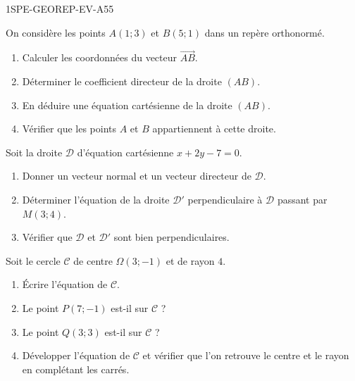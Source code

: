 \begin{evaluation}{1SPE-GEOREP-EV-A}{55}



On considère les points $A(1 ; 3)$ et $B(5 ; 1)$ dans un repère orthonormé.

\begin{enumerate}
  \item Calculer les coordonnées du vecteur $\vec{AB}$.
  \item Déterminer le coefficient directeur de la droite $(AB)$.
  \item En déduire une équation cartésienne de la droite $(AB)$.
  \item Vérifier que les points $A$ et $B$ appartiennent à cette droite.
\end{enumerate}



Soit la droite $\mathcal{D}$ d'équation cartésienne $x + 2y - 7 = 0$.

\begin{enumerate}
  \item Donner un vecteur normal et un vecteur directeur de $\mathcal{D}$.
  \item Déterminer l'équation de la droite $\mathcal{D}'$ perpendiculaire à $\mathcal{D}$ passant par $M(3 ; 4)$.
  \item Vérifier que $\mathcal{D}$ et $\mathcal{D}'$ sont bien perpendiculaires.
\end{enumerate}



Soit le cercle $\mathcal{C}$ de centre $\Omega(3 ; -1)$ et de rayon $4$.

\begin{enumerate}
  \item Écrire l'équation de $\mathcal{C}$.
  \item Le point $P(7 ; -1)$ est-il sur $\mathcal{C}$ ?
  \item Le point $Q(3 ; 3)$ est-il sur $\mathcal{C}$ ?
  \item Développer l'équation de $\mathcal{C}$ et vérifier que l'on retrouve le centre et le rayon en complétant les carrés.
\end{enumerate}


\end{evaluation}
